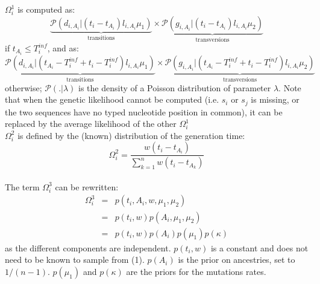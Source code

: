 \documentclass[10pt]{article}
\begin{document}
$\Omega_i^1$ is computed as: 
$$
\underbrace{\mathcal{P}\left(d_{i,A_i} | (t_i - t_{A_i}) l_{i,A_i} \mu_1 \right)}_{\mbox{transitions}}
\times 
\underbrace{\mathcal{P}\left(g_{i,A_i} | (t_i - t_{A_i}) l_{i,A_i} \mu_2 \right)}_{\mbox{transversions}}
$$
if $t_{A_i} \leq T_i^{inf} $, and as:
$$
\underbrace{\mathcal{P}\left(d_{i,A_i} | (t_{A_i} - T_i^{inf} + t_i - T_i^{inf}) l_{i,A_i} \mu_1 \right)}_{\mbox{transitions}}
\times 
\underbrace{\mathcal{P}\left(g_{i,A_i} | (t_{A_i} - T_i^{inf} + t_i - T_i^{inf}) l_{i,A_i} \mu_2 \right)}_{\mbox{transversions}}
$$
otherwise; $\mathcal{P}(. | \lambda)$ is the density of a Poisson distribution of parameter $\lambda$.
Note that when the genetic likelihood cannot be computed (i.e. $s_i$ or $s_j$ is missing, or the two sequences have no typed nucleotide position in common), it can be replaced by the average likelihood of the other $\Omega_i^{1}$
~\\





$\Omega_i^2$ is defined by the (known) distribution of the generation time:
$$
\Omega_i^2 = \frac{w(t_i - t_{A_i})}{\sum_{k=1}^n w(t_i - t_{A_k})} 
$$
~\\



The term $\Omega_i^3$ can be rewritten:
\begin{eqnarray}
\Omega_i^3 &=&  p(t_i, A_i, w, \mu_1, \mu_2) \\
	 &=&  p(t_i, w) p(A_i, \mu_1, \mu_2) \\
	 &=&  p(t_i, w) p(A_i) p(\mu_1) p(\kappa) 
\end{eqnarray}
as the different components are independent.
$p(t_i, w)$ is a constant and does not need to be known to sample from (1).
$p(A_i)$ is the prior on ancestries, set to $1/(n-1)$.
$ p(\mu_1)$ and $p(\kappa)$ are the priors for the mutations rates.
\end{document}
